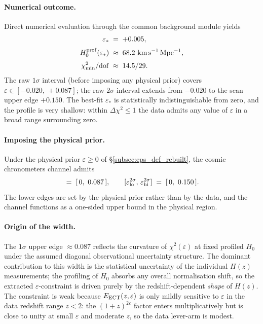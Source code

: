 \paragraph{Numerical outcome.}
Direct numerical evaluation through the common background module
yields
\begin{align}
\varepsilon_*
&\;=\; +0.005,
\\[2pt]
H_0^{\rm prof}(\varepsilon_*)
&\;\approx\; 68.2~\mathrm{km\,s^{-1}\,Mpc^{-1}},
\\[2pt]
\chi^2_{\min} / {\rm dof}
&\;\approx\; 14.5 / 29.
\end{align}
The raw $1\sigma$ interval (before imposing any physical prior)
covers $\varepsilon \in [-0.020,\,+0.087]$; the raw $2\sigma$
interval extends from $-0.020$ to the scan upper edge
$+0.150$. The best-fit $\varepsilon_*$ is statistically
indistinguishable from zero, and the profile is very shallow:
within $\Delta\chi^2 \leq 1$ the data admits any value of
$\varepsilon$ in a broad range surrounding zero.

\paragraph{Imposing the physical prior.}
Under the physical prior $\varepsilon \geq 0$ of
\S\ref{subsec:eps_def_rebuilt}, the cosmic chronometers channel
admits
\begin{equation}
[\varepsilon_{\rm lo}^{1\sigma},\,\varepsilon_{\rm hi}^{1\sigma}]
\;=\;
[\,0,\ 0.087\,],
\qquad
[\varepsilon_{\rm lo}^{2\sigma},\,\varepsilon_{\rm hi}^{2\sigma}]
\;=\;
[\,0,\ 0.150\,].
\label{eq:eps_cc_retained}
\end{equation}
The lower edges are set by the physical prior rather than by the
data, and the channel functions as a one-sided upper bound in the
physical region.

\paragraph{Origin of the width.}
The $1\sigma$ upper edge $\approx 0.087$ reflects the curvature of
$\chi^2(\varepsilon)$ at fixed profiled $H_0$ under the assumed
diagonal observational uncertainty structure. The dominant
contribution to this width is the statistical uncertainty of the
individual $H(z)$ measurements; the profiling of $H_0$ absorbs
any overall normalisation shift, so the extracted
$\varepsilon$-constraint is driven purely by the redshift-dependent
\emph{shape} of $H(z)$. The constraint is weak because
$E_{\rm ECT}(z, \varepsilon)$ is only mildly sensitive to
$\varepsilon$ in the data redshift range $z < 2$: the
$(1+z)^{2\varepsilon}$ factor enters multiplicatively but is close
to unity at small $\varepsilon$ and moderate $z$, so the
data lever-arm is modest.

